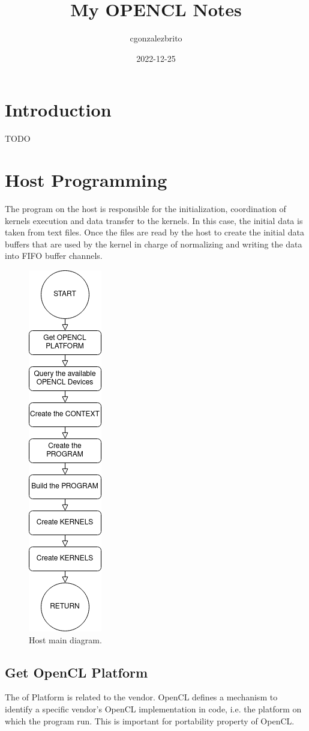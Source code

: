 \documentclass{article}
\title{My OPENCL Notes}
\date{2022-12-25}
\author{cgonzalezbrito}
\begin{document}
  \maketitle
  \newpage
  \section{Introduction}
  TODO
  \section{Host Programming}
  The program on the host is responsible for the initialization, coordination of kernels execution and data transfer to the kernels. In this case, the initial data is taken from text files. Once the files are read by the host to create the initial data buffers that are used by the kernel in charge of normalizing and writing the data into FIFO buffer channels.

  \begin{figure}[h!]
    \includegraphics[width=0.2\linewidth]{images/host_diagram.png}
    \caption{Host main diagram.}
    \label{fig:Host functions main daigram}
  \end{figure}

  \subsection{Get OpenCL Platform}
  The of Platform is related to the vendor. OpenCL defines a mechanism to identify a specific vendor’s OpenCL implementation in code, i.e. the platform on which the program run. This is important for portability property of OpenCL.
\end{document}

